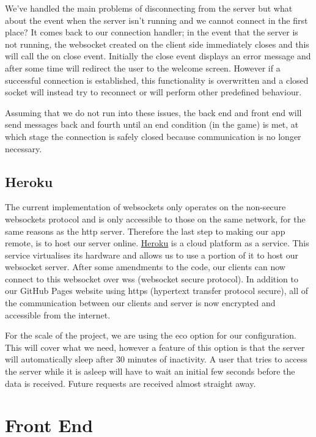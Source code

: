 We've handled the main problems of disconnecting from the server but what about the event when the server isn't running and we cannot connect in the first place? It comes back to our connection handler; in the event that the server is not running, the websocket created on the client side immediately closes and this will call the on close event. Initially the close event displays an error message and after some time will redirect the user to the welcome screen. However if a successful connection is established, this functionality is overwritten and a closed socket will instead try to reconnect or will perform other predefined behaviour.

Assuming that we do not run into these issues, the back end and front end will send messages back and fourth until an end condition (in the game) is met, at which stage the connection is safely closed because communication is no longer necessary.

\subsection{Heroku}

The current implementation of websockets only operates on the non-secure websockets protocol and is only accessible to those on the same network, for the same reasons as the http server. Therefore the last step to making our app remote, is to host our server online. \href{https://www.heroku.com}{Heroku} is a cloud platform as a service. This service virtualises its hardware and allows us to use a portion of it to host our websocket server. After some amendments to the code, our clients can now connect to this websocket over wss (websocket secure protocol). In addition to our GitHub Pages website using https (hypertext transfer protocol secure), all of the communication between our clients and server is now encrypted and accessible from the internet.

For the scale of the project, we are using the eco option for our configuration. This will cover what we need, however a feature of this option is that the server will automatically sleep after 30 minutes of inactivity. A user that tries to access the server while it is asleep will have to wait an initial few seconds before the data is received. Future requests are received almost straight away.

\section{Front End}

